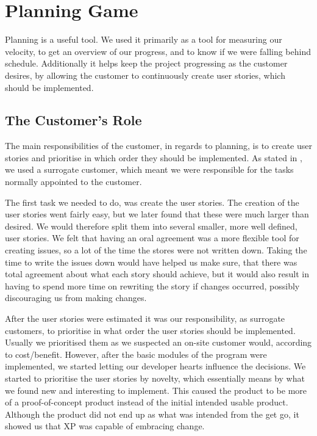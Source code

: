 \section{Planning Game}
Planning is a useful tool.
We used it primarily as a tool for measuring our velocity, to get an overview of our progress, and to know if we were falling behind schedule.
Additionally it helps keep the project progressing as the customer desires, by allowing the customer to continuously create user stories, which should be implemented.

\subsection{The Customer's Role}
The main responsibilities of the customer, in regards to planning, is to create user stories and prioritise in which order they should be implemented.
As stated in , we used a surrogate customer, which meant we were responsible for the tasks normally appointed to the customer.

The first task we needed to do, was create the user stories.
The creation of the user stories went fairly easy, but we later found that these were much larger than desired.
We would therefore split them into several smaller, more well defined, user stories.
We felt that having an oral agreement was a more flexible tool for creating issues, so a lot of the time the stores were not written down.
Taking the time to write the issues down would have helped us make sure, that there was total agreement about what each story should achieve, but it would also result in having to spend more time on rewriting the story if changes occurred, possibly discouraging us from making changes.

After the user stories were estimated it was our responsibility, as surrogate customers, to prioritise in what order the user stories should be implemented.
Usually we prioritised them as we suspected an on-site customer would, according to cost/benefit.
However, after the basic modules of the program were implemented, we started letting our developer hearts influence the decisions.
We started to prioritise the user stories by novelty, which essentially means by what we found new and interesting to implement.
This caused the product to be more of a proof-of-concept product instead of the initial intended usable product.
Although the product did not end up as what was intended from the get go, it showed us that XP was capable of embracing change.


